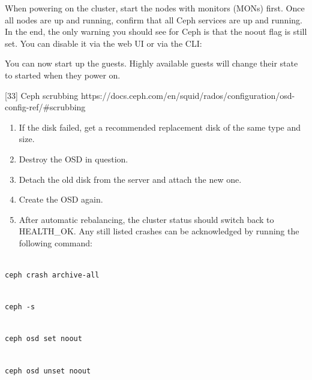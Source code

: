 When powering on the cluster, start the nodes with monitors (MONs) first. Once all nodes are up and running, confirm that all Ceph services are up and running. In the end, the only warning you should see for Ceph is that the noout flag is still set. You can disable it via the web UI or via the CLI:

You can now start up the guests. Highly available guests will change their state to started when they power on.

[33] Ceph scrubbing https://docs.ceph.com/en/squid/rados/configuration/osd-config-ref/#scrubbing

\begin{enumerate}[leftmargin=2cm]

	\item If the disk failed, get a recommended replacement disk of the same type and size.

	\item Destroy the OSD in question.

	\item Detach the old disk from the server and attach the new one.

	\item Create the OSD again.

	\item After automatic rebalancing, the cluster status should switch back to HEALTH_OK. Any still listed crashes can be acknowledged by running the following command:

\end{enumerate}

\begin{lstlisting}

ceph crash archive-all

\end{lstlisting}

\begin{lstlisting}

ceph -s

\end{lstlisting}

\begin{lstlisting}

ceph osd set noout

\end{lstlisting}

\begin{lstlisting}

ceph osd unset noout

\end{lstlisting}



